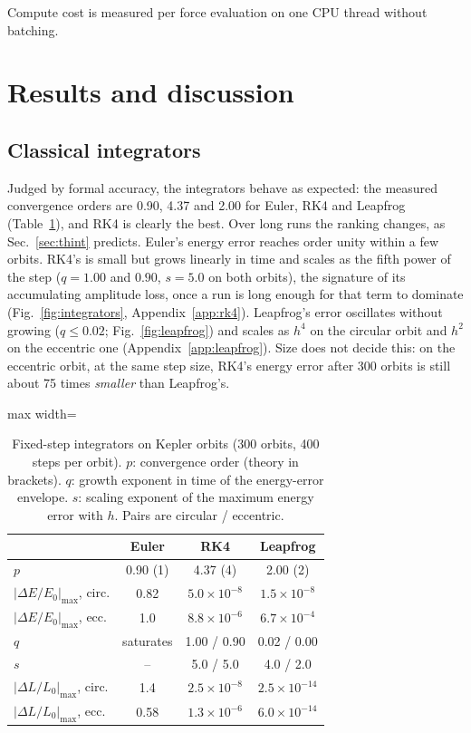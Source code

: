 \documentclass[a4paper,journal]{IEEEtran}
\begin{document}
Compute cost is measured per force evaluation on one CPU thread without batching.

\section{Results and discussion}\label{sec:results}

\subsection{Classical integrators}\label{sec:integrators}

Judged by formal accuracy, the integrators behave as expected: the measured convergence orders are 0.90, 4.37 and 2.00 for Euler, RK4 and Leapfrog (Table~\ref{tab:integrators}), and RK4 is clearly the best. Over long runs the ranking changes, as Sec.~\ref{sec:thint} predicts. Euler's energy error reaches order unity within a few orbits. RK4's is small but grows linearly in time and scales as the fifth power of the step ($q=1.00$ and $0.90$, $s=5.0$ on both orbits), the signature of its accumulating amplitude loss, once a run is long enough for that term to dominate (Fig.~\ref{fig:integrators}, Appendix~\ref{app:rk4}). Leapfrog's error oscillates without growing ($q\le0.02$; Fig.~\ref{fig:leapfrog}) and scales as $h^4$ on the circular orbit and $h^2$ on the eccentric one (Appendix~\ref{app:leapfrog}). Size does not decide this: on the eccentric orbit, at the same step size, RK4's energy error after 300 orbits is still about 75 times \emph{smaller} than Leapfrog's.

\begin{table}[H]
\caption{Fixed-step integrators on Kepler orbits (300 orbits, 400 steps per orbit). $p$: convergence order (theory in brackets). $q$: growth exponent in time of the energy-error envelope. $s$: scaling exponent of the maximum energy error with $h$. Pairs are circular / eccentric.}
\label{tab:integrators}
\centering
\begin{adjustbox}{max width=\columnwidth}
\begin{tabular}{lccc}
\toprule
 & Euler & RK4 & Leapfrog\\
\midrule
$p$ & 0.90 (1) & 4.37 (4) & 2.00 (2)\\
$|\Delta E/E_0|_{\max}$, circ. & 0.82 & $5.0{\times}10^{-8}$ & $1.5{\times}10^{-8}$\\
$|\Delta E/E_0|_{\max}$, ecc. & 1.0 & $8.8{\times}10^{-6}$ & $6.7{\times}10^{-4}$\\
$q$ & saturates & 1.00 / 0.90 & 0.02 / 0.00\\
$s$ & -- & 5.0 / 5.0 & 4.0 / 2.0\\
$|\Delta L/L_0|_{\max}$, circ. & 1.4 & $2.5{\times}10^{-8}$ & $2.5{\times}10^{-14}$\\
$|\Delta L/L_0|_{\max}$, ecc. & 0.58 & $1.3{\times}10^{-6}$ & $6.0{\times}10^{-14}$\\
\bottomrule
\end{tabular}
\end{adjustbox}
\end{table}
\end{document}
